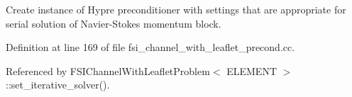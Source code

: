 Create instance of Hypre preconditioner with settings that are appropriate for serial solution of Navier-\/\+Stokes momentum block. 



Definition at line 169 of file fsi\+\_\+channel\+\_\+with\+\_\+leaflet\+\_\+precond.\+cc.



Referenced by F\+S\+I\+Channel\+With\+Leaflet\+Problem$<$ E\+L\+E\+M\+E\+N\+T $>$\+::set\+\_\+iterative\+\_\+solver().

